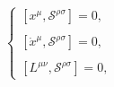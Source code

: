 \begin{equation}
\left\{ 
\begin{array}{c}
\left[ x^{\mu },\mathcal{S}^{\rho \sigma }\right] =0, \\ 
\\ 
\left[ \dot{x}^{\mu },\mathcal{S^{\rho \sigma }}\right] =0, \\ 
\\ 
\left[ L^{\mu \nu },\mathcal{S^{\rho \sigma }}\right] =0,
\end{array}
\right.
\end{equation}

